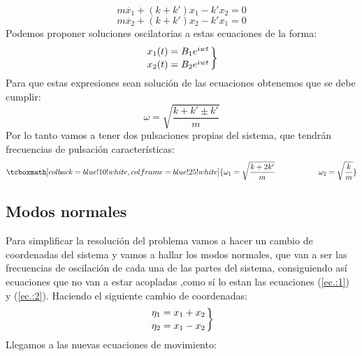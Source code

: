 \documentclass{article}
\begin{document}
\begin{equation}
m\ddot{x_1}+(k+k')x_1 -k'x_2  = 0\label{ec.:1}
\end{equation}
\begin{equation}
m\ddot{x_2}+(k+k')x_2 -k'x_1  = 0\label{ec.:2}
\end{equation}
Podemos proponer soluciones oscilatorias a estas ecuaciones de la forma:
\begin{equation}\left.
x_1(t)=B_1e^{iwt}\atop
x_2(t)=B_2e^{iwt}
\right\}\end{equation}
Para que estas expresiones sean solución de las ecuaciones obtenemos que se debe cumplir:
\begin{equation}
\omega = \sqrt{\frac{k+k'\pm k'}{m}}
\end{equation}
Por lo tanto vamos a tener dos pulsaciones propias del sistema, que tendrán frecuencias de pulsación características:\newline
\begin{equation}\tcboxmath[colback=blue!10!white,colframe=blue!25!white]{\omega_1 = \sqrt{\frac{k+2k'}{m}}\hspace{2cm}\omega_2 = \sqrt{\frac{k}{m}}}\label{ec.:5}\end{equation}
\subsection{Modos normales}
Para simplificar la resolución del problema vamos a hacer un cambio de coordenadas del sistema y vamos a hallar los modos normales, que van a ser las frecuencias de oscilación de cada una de las partes del sistema, consiguiendo así ecuaciones que no van a estar acopladas ,como sí lo estan las ecuaciones (\ref{ec.:1}) y (\ref{ec.:2}).\newline\linebreak
Haciendo el siguiente cambio de coordenadas:
\begin{equation}\notag\left.
\eta_1 = x_1+x_2\atop
\eta_2 = x_1-x_2
\right\}\end{equation}
Llegamos a las nuevas ecuaciones de movimiento:
\end{document}
